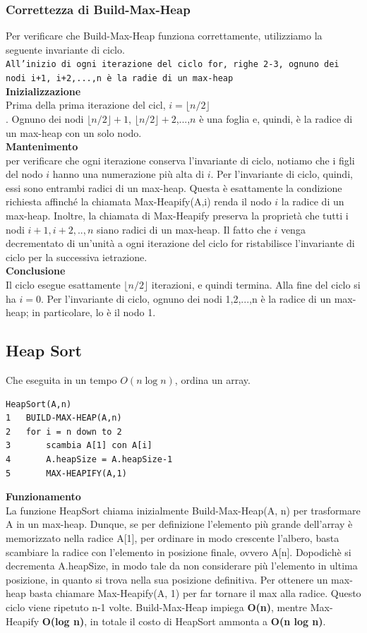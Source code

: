 \subsubsection{Correttezza di Build-Max-Heap}
Per verificare che Build-Max-Heap funziona correttamente, utilizziamo la seguente invariante di ciclo.\\
\texttt{All'inizio di ogni iterazione del ciclo for, righe 2-3, ognuno dei nodi i+1, i+2,...,n è la radie di un max-heap}\\
\textbf{Inizializzazione}\\
Prima della prima iterazione del cicl, $i =\lfloor n/2 \rfloor$\\. Ognuno dei nodi $\lfloor n/2 \rfloor + 1$, $\lfloor n/2 \rfloor + 2$,...,$n$ è una foglia e, quindi, è la radice di un max-heap con un solo nodo. \\
\textbf{Mantenimento}\\
per verificare che ogni iterazione conserva l'invariante di ciclo, notiamo che i figli del nodo $i$ hanno una numerazione più alta di $i$. Per l'invariante di ciclo, quindi, essi sono entrambi radici di un max-heap. Questa è esattamente la condizione richiesta affinché la chiamata Max-Heapify(A,i) renda il nodo $i$ la radice di un max-heap. Inoltre, la chiamata di Max-Heapify preserva la proprietà che tutti i nodi $i+1,i+2,..,n$ siano radici di un max-heap. Il fatto che $i$ venga decrementato di un'unità a ogni iterazione del ciclo for ristabilisce l'invariante di ciclo per la successiva ietrazione. \\
\textbf{Conclusione}\\
Il ciclo esegue esattamente $\lfloor n/2 \rfloor$ iterazioni, e quindi termina. Alla fine del ciclo si ha $i=0$. Per l'invariante di ciclo, ognuno dei nodi 1,2,...,n è la radice di un max-heap; in particolare, lo è il nodo 1.
\subsection{Heap Sort}
Che eseguita in un tempo $O(n \log n)$, ordina un array.
\begin{verbatim}
HeapSort(A,n)
1   BUILD-MAX-HEAP(A,n)
2   for i = n down to 2
3       scambia A[1] con A[i]
4       A.heapSize = A.heapSize-1
5       MAX-HEAPIFY(A,1)
\end{verbatim}
\noindent \textbf{Funzionamento}\\
La funzione HeapSort chiama inizialmente Build-Max-Heap(A, n) per trasformare A in un max-heap. Dunque, se per definizione l’elemento più grande dell’array è memorizzato 
nella radice A[1], per ordinare in modo crescente l’albero, basta scambiare la radice con l’elemento in posizione finale, ovvero A[n]. Dopodichè si decrementa A.heapSize, 
in modo tale da non considerare più l’elemento in ultima posizione, in quanto si trova nella sua posizione definitiva. Per ottenere un max-heap basta chiamare Max-Heapify(A, 1) 
per far tornare il max alla radice. Questo ciclo viene ripetuto n-1 volte. Build-Max-Heap impiega \textbf{O(n)}, mentre
Max-Heapify \textbf{O(log n)}, in totale il costo di HeapSort ammonta a \textbf{O(n log n)}.

